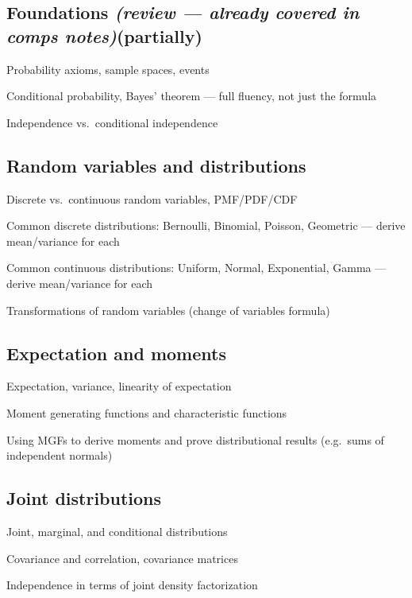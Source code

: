 \documentclass[11pt]{article}
\newcommand{\review}{\textit{(review — already covered in comps notes)}}
\begin{document}
\subsection{Foundations \review (partially)}
\begin{tasklist}
    \item Probability axioms, sample spaces, events
    \item Conditional probability, Bayes' theorem — full fluency, not just the formula
    \item Independence vs.\ conditional independence
\end{tasklist}

\subsection{Random variables and distributions}
\begin{tasklist}
    \item Discrete vs.\ continuous random variables, PMF/PDF/CDF
    \item Common discrete distributions: Bernoulli, Binomial, Poisson, Geometric — derive mean/variance for each
    \item Common continuous distributions: Uniform, Normal, Exponential, Gamma — derive mean/variance for each
    \item Transformations of random variables (change of variables formula)
\end{tasklist}

\subsection{Expectation and moments}
\begin{tasklist}
    \item Expectation, variance, linearity of expectation
    \item Moment generating functions and characteristic functions
    \item Using MGFs to derive moments and prove distributional results (e.g.\ sums of independent normals)
\end{tasklist}

\subsection{Joint distributions}
\begin{tasklist}
    \item Joint, marginal, and conditional distributions
    \item Covariance and correlation, covariance matrices
    \item Independence in terms of joint density factorization
\end{tasklist}
\end{document}
